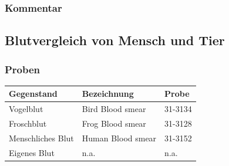 \subsubsection{Kommentar}

\newpage
\subsection{Blutvergleich von Mensch und Tier}

\subsubsection{Proben}
\begin{table}[h!]
	\centering
	\begin{tabular}{l l l}
		Gegenstand
			& Bezeichnung
			& Probe \\
		\hline
		Vogelblut
			& Bird Blood smear
			& 31-3134 \\
		Froschblut
			& Frog Blood smear
			& 31-3128 \\
		Menschliches Blut
			& Human Blood smear
			& 31-3152 \\
		Eigenes Blut
			& n.a.
			& n.a. \\
	\end{tabular}
\end{table}

